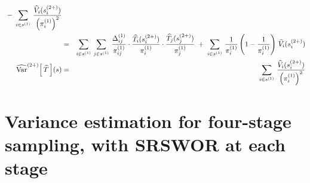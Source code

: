\begin{corollary}
\begin{eqnarray*}
\;-\;\sum_{i\in s^{(1)}}\,\dfrac{\widehat{V}_{i}(s^{(2+)}_{i})}{\left(\pi^{(1)}_{i}\right)^{2}}
\\
&=&
\sum_{i\in s^{(1)}}\,\sum_{j\in s^{(1)}}\,
\dfrac{\Delta^{(1)}_{ij}}{\pi^{(1)}_{ij}}
\cdot
\dfrac{\widehat{T}_{i}(s^{(2+)}_{i})}{\pi^{(1)}_{i}}
\cdot
\dfrac{\widehat{T}_{j}(s^{(2+)}_{j})}{\pi^{(1)}_{j}}
\;+\;\sum_{i\in s^{(1)}}\,\dfrac{1}{\pi^{(1)}_{i}} \left(1 - \dfrac{1}{\pi^{(1)}_{i}}\right) \, \widehat{V}_{i}(s^{(2+)}_{i})
\\
\widehat{\textnormal{Var}}^{(2+)}\!\left[\,\widehat{T}\,\right]\!(s)
&=&\sum_{i\in s^{(1)}}\,\dfrac{\widehat{V}_{i}(s^{(2+)}_{i})}{\left(\pi^{(1)}_{i}\right)^{2}}
\end{eqnarray*}
\end{corollary}


\clearpage
\section{Variance estimation for four-stage sampling, with SRSWOR at each stage}
\setcounter{theorem}{0}
\setcounter{equation}{0}

